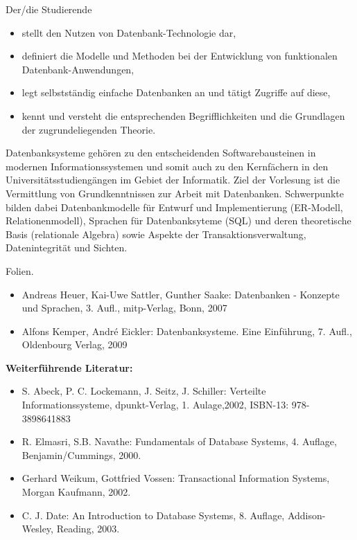 \begin{course}
\begin{learningoutcomes}
Der/die Studierende

 \begin{itemize}\item stellt den Nutzen von Datenbank-Technologie dar,  \item definiert die Modelle und Methoden bei der Entwicklung von funktionalen Datenbank-Anwendungen,  \item legt selbstständig einfache Datenbanken an und tätigt Zugriffe auf diese,  \item kennt und versteht die entsprechenden Begrifflichkeiten und die Grundlagen der zugrundeliegenden Theorie.  \end{itemize}
\end{learningoutcomes}

\begin{content}
Datenbanksysteme gehören zu den entscheidenden Softwarebausteinen in modernen Informationssystemen und somit auch zu den Kernfächern in den Universitätsstudiengängen im Gebiet der Informatik. Ziel der Vorlesung ist die Vermittlung von Grundkenntnissen zur Arbeit mit Datenbanken. Schwerpunkte bilden dabei Datenbankmodelle für Entwurf und Implementierung (ER-Modell, Relationenmodell), Sprachen für Datenbanksyteme (SQL) und deren theoretische Basis (relationale Algebra) sowie Aspekte der Transaktionsverwaltung, Datenintegrität und Sichten.


\end{content}

\begin{media}Folien.

\end{media}

\begin{literature}\begin{itemize}\item Andreas Heuer, Kai-Uwe Sattler, Gunther Saake: Datenbanken - Konzepte und Sprachen, 3. Aufl., mitp-Verlag, Bonn, 2007  \item Alfons Kemper, André Eickler: Datenbanksysteme. Eine Einführung, 7. Aufl., Oldenbourg Verlag, 2009  \end{itemize}

\textbf{Weiterführende Literatur:}

 \begin{itemize}\item S. Abeck, P. C. Lockemann, J. Seitz, J. Schiller: Verteilte Informationssysteme, dpunkt-Verlag, 1. Aulage,2002, ISBN-13: 978-3898641883  \item R. Elmasri, S.B. Navathe: Fundamentals of Database Systems, 4. Auflage, Benjamin/Cummings, 2000.  \item Gerhard Weikum, Gottfried Vossen: Transactional Information Systems, Morgan Kaufmann, 2002.  \item C. J. Date: An Introduction to Database Systems, 8. Auflage, Addison-Wesley, Reading, 2003.  \end{itemize}\end{literature}


\end{course}
